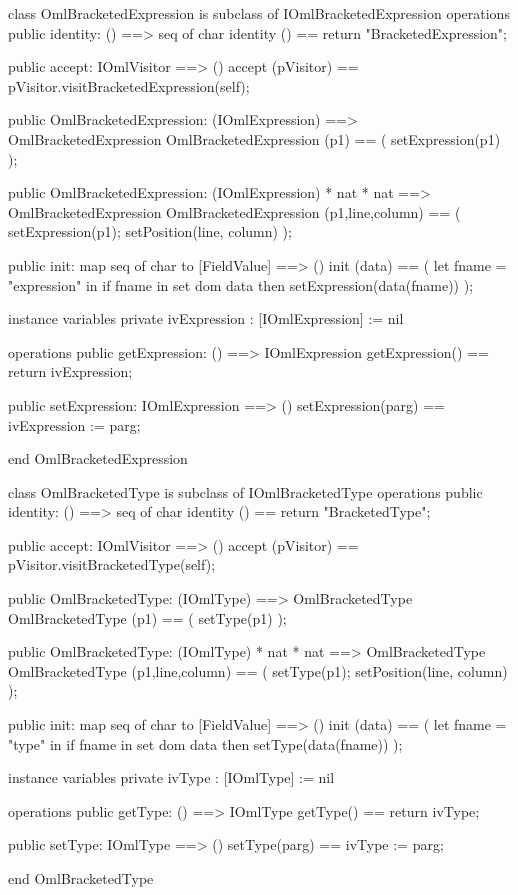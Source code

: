 \begin{vdm_al}
class OmlBracketedExpression is subclass of IOmlBracketedExpression
operations
  public identity: () ==> seq of char
  identity () == return "BracketedExpression";

  public accept: IOmlVisitor ==> ()
  accept (pVisitor) == pVisitor.visitBracketedExpression(self);

  public OmlBracketedExpression:
    (IOmlExpression) ==> OmlBracketedExpression
  OmlBracketedExpression (p1) == 
    ( setExpression(p1) );

  public OmlBracketedExpression:
    (IOmlExpression) *
    nat *
    nat ==> OmlBracketedExpression
  OmlBracketedExpression (p1,line,column) == 
    ( setExpression(p1);
      setPosition(line, column) );

  public init: map seq of char to [FieldValue] ==> ()
  init (data) ==
    ( let fname = "expression" in
        if fname in set dom data
        then setExpression(data(fname)) );

instance variables
  private ivExpression : [IOmlExpression] := nil

operations
  public getExpression: () ==> IOmlExpression
  getExpression() == return ivExpression;

  public setExpression: IOmlExpression ==> ()
  setExpression(parg) == ivExpression := parg;

end OmlBracketedExpression
\end{vdm_al}

\begin{vdm_al}
class OmlBracketedType is subclass of IOmlBracketedType
operations
  public identity: () ==> seq of char
  identity () == return "BracketedType";

  public accept: IOmlVisitor ==> ()
  accept (pVisitor) == pVisitor.visitBracketedType(self);

  public OmlBracketedType:
    (IOmlType) ==> OmlBracketedType
  OmlBracketedType (p1) == 
    ( setType(p1) );

  public OmlBracketedType:
    (IOmlType) *
    nat *
    nat ==> OmlBracketedType
  OmlBracketedType (p1,line,column) == 
    ( setType(p1);
      setPosition(line, column) );

  public init: map seq of char to [FieldValue] ==> ()
  init (data) ==
    ( let fname = "type" in
        if fname in set dom data
        then setType(data(fname)) );

instance variables
  private ivType : [IOmlType] := nil

operations
  public getType: () ==> IOmlType
  getType() == return ivType;

  public setType: IOmlType ==> ()
  setType(parg) == ivType := parg;

end OmlBracketedType
\end{vdm_al}

